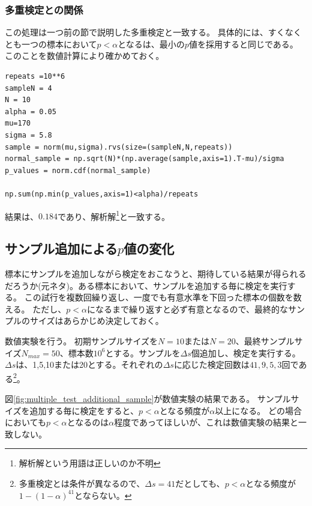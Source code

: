 \subsubsection{多重検定との関係}
この処理は一つ前の節で説明した多重検定と一致する。
具体的には、すくなくとも一つの標本において$p<\alpha$となるは、最小の$p$値を採用すると同じである。
このことを数値計算により確かめておく。
\begin{lstlisting}
repeats =10**6
sampleN = 4
N = 10
alpha = 0.05
mu=170
sigma = 5.8
sample = norm(mu,sigma).rvs(size=(sampleN,N,repeats))
normal_sample = np.sqrt(N)*(np.average(sample,axis=1).T-mu)/sigma
p_values = norm.cdf(normal_sample)

np.sum(np.min(p_values,axis=1)<alpha)/repeats
\end{lstlisting}
結果は、$0.184$であり、解析解\footnote{解析解という用語は正しいのか不明}と一致する。



\subsection{サンプル追加による$p$値の変化}
標本にサンプルを追加しながら検定をおこなうと、期待している結果が得られるだろうか(元ネタ\cite{simmons2016false})。ある標本において、サンプルを追加する毎に検定を実行する。
この試行を複数回繰り返し、一度でも有意水準を下回った標本の個数を数える。
ただし、$p<\alpha$になるまで繰り返すと必ず有意となるので、最終的なサンプルのサイズはあらかじめ決定しておく。

数値実験を行う。
初期サンプルサイズを$N=10$または$N=20$、最終サンプルサイズ$N_{max}=50$、標本数$10^6$とする。サンプルを$\Delta s$個追加し、検定を実行する。
$\Delta s$は、1,5,10または20とする。それぞれの$\Delta s$に応じた検定回数は$41,9,5,3$回である\footnote{多重検定とは条件が異なるので、$\Delta s=41$だとしても、$p<\alpha$となる頻度が$1-(1-\alpha)^{41}$とならない。}。


図\ref{fig:multiple_test_additional_sample}が数値実験の結果である。
サンプルサイズを追加する毎に検定をすると、$p<\alpha$となる頻度が$\alpha$以上になる。
どの場合においても$p<\alpha$となるのは$\alpha$程度であってほしいが、これは数値実験の結果と一致しない。

